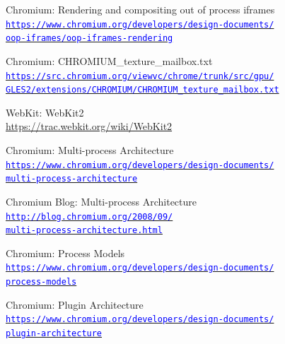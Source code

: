 \documentclass[12pt]{report}
\let\orighref\href
\renewcommand{\href}[2]{%
    \orighref{#1}{\textcolor{blue}{\texttt{#2}}}
}
\let\origurl\url
\renewcommand{\url}[1]{%
    \textcolor{blue}{\origurl{#1}}
}
\begin{document}
\begin{thebibliography}{9}
        Chromium: Rendering and compositing out of process iframes \\
        \href{https://www.chromium.org/developers/design-documents/oop-iframes/oop-iframes-rendering}
        {https://www.chromium.org/developers/design-documents/\\
        oop-iframes/oop-iframes-rendering}

        Chromium: CHROMIUM\_texture\_mailbox.txt \\
        \href{https://src.chromium.org/viewvc/chrome/trunk/src/gpu/GLES2/extensions/CHROMIUM/CHROMIUM_texture_mailbox.txt}
        {https://src.chromium.org/viewvc/chrome/trunk/src/gpu/\\
        GLES2/extensions/CHROMIUM/CHROMIUM\_texture\_mailbox.txt}

        WebKit: WebKit2 \\
        \url{https://trac.webkit.org/wiki/WebKit2}

        Chromium: Multi-process Architecture \\
        \href{https://www.chromium.org/developers/design-documents/multi-process-architecture}
        {https://www.chromium.org/developers/design-documents/\\
        multi-process-architecture}

        Chromium Blog: Multi-process Architecture \\
        \href{http://blog.chromium.org/2008/09/multi-process-architecture.html}
        {http://blog.chromium.org/2008/09/\\
        multi-process-architecture.html}

        Chromium: Process Models \\
        \href{https://www.chromium.org/developers/design-documents/process-models}
        {https://www.chromium.org/developers/design-documents/\\
        process-models}

        Chromium: Plugin Architecture \\
        \href{https://www.chromium.org/developers/design-documents/plugin-architecture}
        {https://www.chromium.org/developers/design-documents/\\
        plugin-architecture}


\end{thebibliography}
\end{document}

